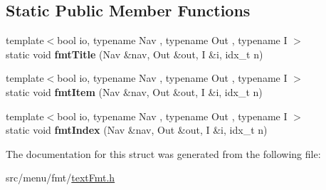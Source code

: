 \subsection*{Static Public Member Functions}
\begin{DoxyCompactItemize}
\item 
\mbox{\label{structTextFmt_ada6a9b8c051e2510f81b435cc43f5a71}} 
{\footnotesize template$<$bool io, typename Nav , typename Out , typename I $>$ }\\static void {\bfseries fmt\+Title} (Nav \&nav, Out \&out, I \&i, idx\+\_\+t n)
\item 
\mbox{\label{structTextFmt_a639276039aced38f5f23cfb98d7acfb6}} 
{\footnotesize template$<$bool io, typename Nav , typename Out , typename I $>$ }\\static void {\bfseries fmt\+Item} (Nav \&nav, Out \&out, I \&i, idx\+\_\+t n)
\item 
\mbox{\label{structTextFmt_a809f84b0f9e6ed2fcc62cfa22185a6d0}} 
{\footnotesize template$<$bool io, typename Nav , typename Out , typename I $>$ }\\static void {\bfseries fmt\+Index} (Nav \&nav, Out \&out, I \&i, idx\+\_\+t n)
\end{DoxyCompactItemize}


The documentation for this struct was generated from the following file\+:\begin{DoxyCompactItemize}
\item 
src/menu/fmt/\hyperlink{textFmt_8h}{text\+Fmt.\+h}\end{DoxyCompactItemize}
